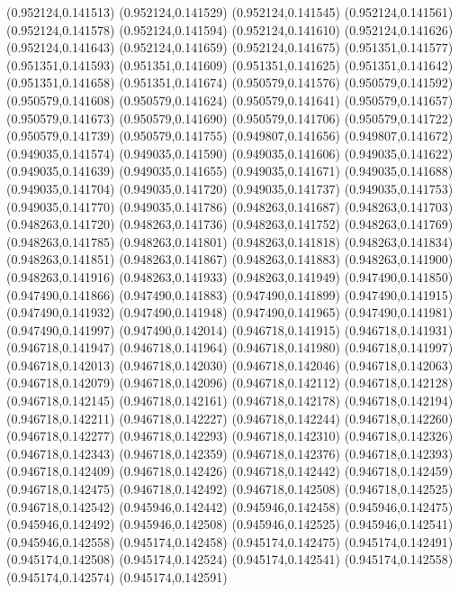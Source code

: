 (0.952124,0.141513)
(0.952124,0.141529)
(0.952124,0.141545)
(0.952124,0.141561)
(0.952124,0.141578)
(0.952124,0.141594)
(0.952124,0.141610)
(0.952124,0.141626)
(0.952124,0.141643)
(0.952124,0.141659)
(0.952124,0.141675)
(0.951351,0.141577)
(0.951351,0.141593)
(0.951351,0.141609)
(0.951351,0.141625)
(0.951351,0.141642)
(0.951351,0.141658)
(0.951351,0.141674)
(0.950579,0.141576)
(0.950579,0.141592)
(0.950579,0.141608)
(0.950579,0.141624)
(0.950579,0.141641)
(0.950579,0.141657)
(0.950579,0.141673)
(0.950579,0.141690)
(0.950579,0.141706)
(0.950579,0.141722)
(0.950579,0.141739)
(0.950579,0.141755)
(0.949807,0.141656)
(0.949807,0.141672)
(0.949035,0.141574)
(0.949035,0.141590)
(0.949035,0.141606)
(0.949035,0.141622)
(0.949035,0.141639)
(0.949035,0.141655)
(0.949035,0.141671)
(0.949035,0.141688)
(0.949035,0.141704)
(0.949035,0.141720)
(0.949035,0.141737)
(0.949035,0.141753)
(0.949035,0.141770)
(0.949035,0.141786)
(0.948263,0.141687)
(0.948263,0.141703)
(0.948263,0.141720)
(0.948263,0.141736)
(0.948263,0.141752)
(0.948263,0.141769)
(0.948263,0.141785)
(0.948263,0.141801)
(0.948263,0.141818)
(0.948263,0.141834)
(0.948263,0.141851)
(0.948263,0.141867)
(0.948263,0.141883)
(0.948263,0.141900)
(0.948263,0.141916)
(0.948263,0.141933)
(0.948263,0.141949)
(0.947490,0.141850)
(0.947490,0.141866)
(0.947490,0.141883)
(0.947490,0.141899)
(0.947490,0.141915)
(0.947490,0.141932)
(0.947490,0.141948)
(0.947490,0.141965)
(0.947490,0.141981)
(0.947490,0.141997)
(0.947490,0.142014)
(0.946718,0.141915)
(0.946718,0.141931)
(0.946718,0.141947)
(0.946718,0.141964)
(0.946718,0.141980)
(0.946718,0.141997)
(0.946718,0.142013)
(0.946718,0.142030)
(0.946718,0.142046)
(0.946718,0.142063)
(0.946718,0.142079)
(0.946718,0.142096)
(0.946718,0.142112)
(0.946718,0.142128)
(0.946718,0.142145)
(0.946718,0.142161)
(0.946718,0.142178)
(0.946718,0.142194)
(0.946718,0.142211)
(0.946718,0.142227)
(0.946718,0.142244)
(0.946718,0.142260)
(0.946718,0.142277)
(0.946718,0.142293)
(0.946718,0.142310)
(0.946718,0.142326)
(0.946718,0.142343)
(0.946718,0.142359)
(0.946718,0.142376)
(0.946718,0.142393)
(0.946718,0.142409)
(0.946718,0.142426)
(0.946718,0.142442)
(0.946718,0.142459)
(0.946718,0.142475)
(0.946718,0.142492)
(0.946718,0.142508)
(0.946718,0.142525)
(0.946718,0.142542)
(0.945946,0.142442)
(0.945946,0.142458)
(0.945946,0.142475)
(0.945946,0.142492)
(0.945946,0.142508)
(0.945946,0.142525)
(0.945946,0.142541)
(0.945946,0.142558)
(0.945174,0.142458)
(0.945174,0.142475)
(0.945174,0.142491)
(0.945174,0.142508)
(0.945174,0.142524)
(0.945174,0.142541)
(0.945174,0.142558)
(0.945174,0.142574)
(0.945174,0.142591)
